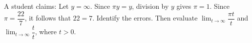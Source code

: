 A student claims: Let $y=\infty$. Since $\pi y=y$, division by $y$ gives $\pi=1$. Since $\pi=\dfrac{22}{7}$, it follows that $22=7$. Identify the errors. Then evaluate $\lim_{t\to\infty}\dfrac{\pi t}{t}$ and $\lim_{t\to\infty}\dfrac{t}{t}$, where $t>0$.
